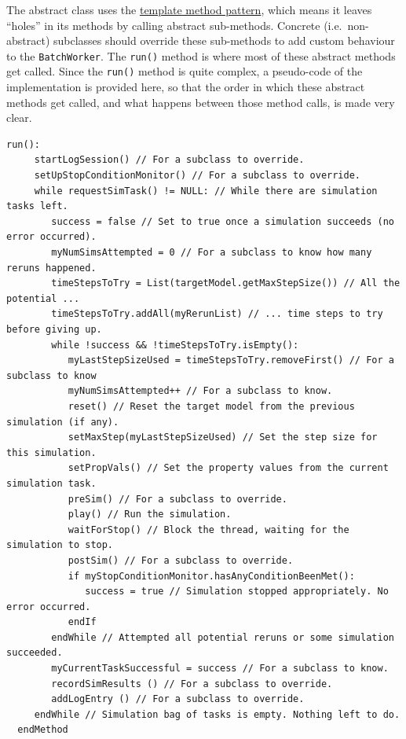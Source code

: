 \documentclass{article}
\newcommand{\BW}{{\tt BatchWorker}}
\begin{document}
The abstract  class uses the \href{https://en.wikipedia.org/wiki/Template_method_pattern}{template method pattern}, which means it leaves ``holes'' in its methods by calling abstract sub-methods. Concrete (i.e.\ non-abstract) subclasses should override these sub-methods to add custom behaviour to the \BW. The {\tt run()} method is where most of these abstract methods get called. Since the {\tt run()} method is quite complex, a pseudo-code of the implementation is provided here, so that the order in which these abstract methods get called, and what happens between those method calls, is made very clear.

\begin{lstlisting}[]
  run():
     startLogSession() // For a subclass to override.
     setUpStopConditionMonitor() // For a subclass to override.
     while requestSimTask() != NULL: // While there are simulation tasks left.
        success = false // Set to true once a simulation succeeds (no error occurred).
        myNumSimsAttempted = 0 // For a subclass to know how many reruns happened.
        timeStepsToTry = List(targetModel.getMaxStepSize()) // All the potential ...
        timeStepsToTry.addAll(myRerunList) // ... time steps to try before giving up.
        while !success && !timeStepsToTry.isEmpty():
           myLastStepSizeUsed = timeStepsToTry.removeFirst() // For a subclass to know
           myNumSimsAttempted++ // For a subclass to know.
           reset() // Reset the target model from the previous simulation (if any).
           setMaxStep(myLastStepSizeUsed) // Set the step size for this simulation.
           setPropVals() // Set the property values from the current simulation task.
           preSim() // For a subclass to override.
           play() // Run the simulation.
           waitForStop() // Block the thread, waiting for the simulation to stop.
           postSim() // For a subclass to override.
           if myStopConditionMonitor.hasAnyConditionBeenMet():
              success = true // Simulation stopped appropriately. No error occurred.
           endIf
        endWhile // Attempted all potential reruns or some simulation succeeded.
        myCurrentTaskSuccessful = success // For a subclass to know.
        recordSimResults () // For a subclass to override.
        addLogEntry () // For a subclass to override.
     endWhile // Simulation bag of tasks is empty. Nothing left to do.
  endMethod
\end{lstlisting}
\end{document}
